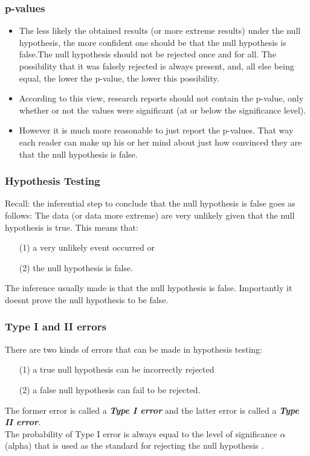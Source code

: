 \documentclass[a4]{beamer}
\begin{document}
\begin{frame}
\frametitle{p-values}
\begin{itemize}
\item The less likely the obtained results (or more extreme results) under the null hypothesis, the more confident one should be that the null hypothesis is false.The null hypothesis should not be rejected once and for all. The possibility that it was falsely rejected is always present, and, all else being equal, the lower the p-value, the lower this possibility.
\item According to this view, research reports should not contain the p-value, only whether or not the values were significant (at or below the significance level).
\item
However it is much more reasonable to just report the p-values. That way each reader can make up his or her mind about just how convinced they are that the null hypothesis is false.
\end{itemize}
\end{frame}
\begin{frame}
\frametitle{Hypothesis Testing}
\large
Recall: the inferential step to conclude that the null hypothesis is false goes as follows: The data (or data more extreme) are very unlikely given that the null hypothesis is true.
\bigskip
This means that:
\begin{itemize}\item [(1)] a very unlikely event occurred or
\item[(2)] the null hypothesis is false. \end{itemize}
The inference usually made is that the null hypothesis is false. Importantly it doesnt prove the null hypothesis to be false.
\end{frame}
\begin{frame}
\frametitle{Type I and II errors}
\large
There are two kinds of errors that can be made in hypothesis testing:
\begin{itemize}
\item[(1)] a true null hypothesis can be incorrectly rejected
\item[(2)] a false null hypothesis can fail to be rejected.
\end{itemize}
The former error is called a \textbf{\emph{Type I error}} and the latter error is called a \textbf{\emph{Type II error}}. \\ \bigskip
The probability of Type I error is always equal to the level of significance $\alpha$ (alpha) that is used as the standard for rejecting the null hypothesis .
\end{frame}
\end{document}
